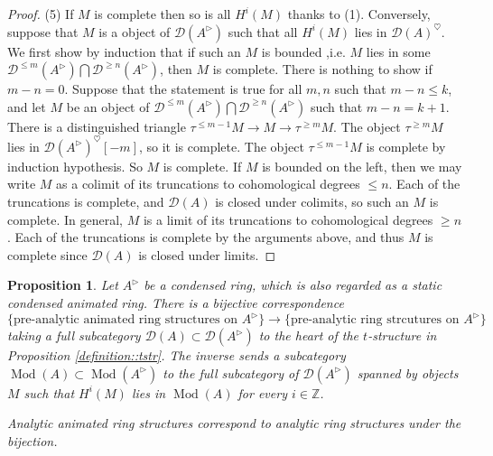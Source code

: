 \documentclass{article}
\theoremstyle{plain}
\newtheorem{prop}[thm]{Proposition}
\theoremstyle{definition}
\theoremstyle{remark}
\DeclareMathOperator{\modcat}{Mod}
\newcommand{\huflag}{\triangleright}
\newcommand{\D}{\mathcal{D}}
\newcommand{\heart}{\heartsuit}
\begin{document}
\begin{proof}
(5)
If $ M $ is complete then so is all $ H ^{i}(M) $ thanks to (1).
Conversely, suppose that $ M $ is a object of $ \D (A ^{\huflag}) $ such that all $ H ^{i}(M) $ lies in $ \D (A)^{\heart} $.
We first show by induction that
if such an $ M $ is bounded ,i.e. $ M $ lies in some $ \D ^{\leq m}(A ^{\huflag}) \bigcap \D ^{\geq n}(A ^{\huflag}) $,
then $ M $ is complete.
There is nothing to show if $ m-n=0 $. Suppose that the statement is true for all $ m,n $ such that $ m-n\leq k $,
and let $ M $ be an object of $ \D ^{\leq m}(A ^{\huflag}) \bigcap \D ^{\geq n}(A ^{\huflag}) $ such that $ m-n=k+1 $.
There is a distinguished triangle $ \tau ^{\leq m-1} M \to M \to \tau ^{\geq m} M $.
The object $ \tau ^{\geq m}M $ lies in $ \D (A ^{\huflag})^{\heart}[-m] $, so it is complete.
The object $ \tau ^{\leq m-1} M $ is complete by induction hypothesis.
So $ M $ is complete.
If $ M $ is bounded on the left, then we may write $ M $ as a colimit of its truncations to cohomological degrees $ \leq n $.
Each of the truncations is complete, and $ \D (A) $ is closed under colimits, so such an $ M $ is complete.
In general, $ M $ is a limit of its truncations to cohomological degrees $ \geq n $.
Each of the truncations is complete by the arguments above, and thus $ M $ is complete since $ \D (A) $ is closed under limits.
\end{proof}

\begin{prop}
Let $ A ^{\huflag} $ be a condensed ring, which is also regarded as a static condensed animated ring.
There is a bijective correspondence
$$ \{\text{pre-analytic animated ring structures on } A ^{\huflag}\} \to \{\text{pre-analytic ring strcutures on } A ^{\huflag}\} $$
taking a full subcategory $ \D (A)\subset \D (A ^{\huflag}) $ to the heart of the $ t $-structure in Proposition \ref{definition::tstr}.
The inverse sends a subcategory $ \modcat (A)\subset \modcat (A ^{\huflag}) $ to the full subcategory of $ \D (A ^{\huflag}) $ spanned by
objects $ M $ such that $ H ^{i}(M) $ lies in $ \modcat (A) $ for every $ i\in \mathbb{Z} $.

Analytic animated ring structures correspond to analytic ring structures under the bijection.
\end{prop}
\end{document}
